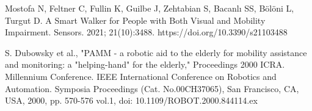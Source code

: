 \begin{thebibliography}{45}
	
	 Mostofa N, Feltner C, Fullin K, Guilbe J, Zehtabian S, Bacanlı SS, Bölöni L, Turgut D. A Smart Walker for People with Both Visual and Mobility Impairment. Sensors. 2021; 21(10):3488. https://doi.org/10.3390/s21103488
	
	 S. Dubowsky et al., "PAMM - a robotic aid to the elderly for mobility assistance and monitoring: a "helping-hand" for the elderly," Proceedings 2000 ICRA. Millennium Conference. IEEE International Conference on Robotics and Automation. Symposia Proceedings (Cat. No.00CH37065), San Francisco, CA, USA, 2000, pp. 570-576 vol.1, doi: 10.1109/ROBOT.2000.844114.ex
	
	
\end{thebibliography}